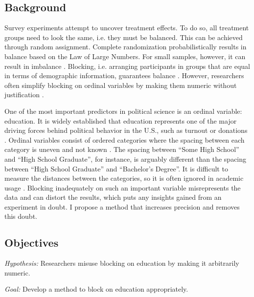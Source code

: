 \documentclass[11pt]{article}
\begin{document}
\subsection{Background}

Survey experiments attempt to uncover treatment effects. To do so, all treatment groups need to look the same, i.e. they must be balanced. This can be achieved through random assignment. Complete randomization probabilistically results in balance based on the Law of Large Numbers. For small samples, however, it can result in imbalance \citep{holland_1986_statistics,rubin_1974_estimating}. Blocking, i.e. arranging participants in groups that are equal in terms of demographic information, guarantees balance \citep{moore_blocking_2013,imai_2009_essential}. However, researchers often simplify blocking on ordinal variables by making them numeric without justification \citep{urdan_statistics_2010,imai_quantitative_2018}. 

One of the most important predictors in political science is an ordinal variable: education. It is widely established that education represents one of the major driving forces behind political behavior in the U.S., such as turnout or donations \citep{dawood_campaign_2015,leighley_who_2014,druckman_how_2013}. Ordinal variables consist of ordered categories where the spacing between each category is uneven and not known \citep{agresti_2010_analysis,agresti_1990_categorical,king_a-politically_2007}. The spacing between ``Some High School'' and ``High School Graduate'', for instance, is arguably different than the spacing between ``High School Graduate'' and ``Bachelor's Degree''. It is difficult to measure the distances between the categories, so it is often ignored in academic usage \citep{king_designing_1994,fox_applied_2015}.  Blocking inadequately on such an important variable misrepresents the data and can distort the results, which puts any insights gained from an experiment in doubt. I propose a method that increases precision and removes this doubt.



\subsection{Objectives}

\textit{Hypothesis:} Researchers misuse blocking on education by making it arbitrarily numeric.\par 
\noindent \textit{Goal:} Develop a method to block on education appropriately.
\end{document}
